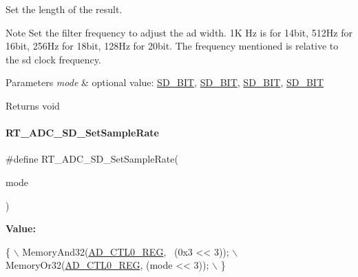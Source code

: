 Set the length of the result. 

\begin{DoxyNote}{Note}
Set the filter frequency to adjust the ad width. 1K Hz is for 14bit, 512\+Hz for 16bit, 256\+Hz for 18bit, 128\+Hz for 20bit. The frequency mentioned is relative to the sd clock frequency. 
\end{DoxyNote}

\begin{DoxyParams}{Parameters}
{\em mode} & optional value\+: \mbox{\hyperlink{a00002_a44030e617a742aba101c6dcd3ec2078ea9c86002a4a99d0d440bca9b7f8d2ec93}{S\+D\+\_\+B\+IT}}, \mbox{\hyperlink{a00002_a44030e617a742aba101c6dcd3ec2078ea43562124882d2ecf1ce1b062c46e035c}{S\+D\+\_\+B\+IT}}, \mbox{\hyperlink{a00002_a44030e617a742aba101c6dcd3ec2078eacac5c6814a8f28e35ebeef99751a9d5f}{S\+D\+\_\+B\+IT}}, \mbox{\hyperlink{a00002_a44030e617a742aba101c6dcd3ec2078ea3a9f3242e2567dcfb29f566e45cf6de0}{S\+D\+\_\+B\+IT}} \\
\hline
\end{DoxyParams}
\begin{DoxyReturn}{Returns}
void 
\end{DoxyReturn}
\mbox{\label{a00002_a246ce987fa2b9f254f4796340eb23ed0}} 
\paragraph{\texorpdfstring{R\+T\+\_\+\+A\+D\+C\+\_\+\+S\+D\+\_\+\+Set\+Sample\+Rate}{RT\_ADC\_SD\_SetSampleRate}}
{\footnotesize\ttfamily \#define R\+T\+\_\+\+A\+D\+C\+\_\+\+S\+D\+\_\+\+Set\+Sample\+Rate(\begin{DoxyParamCaption}\item[{}]{mode }\end{DoxyParamCaption})}

{\bfseries Value\+:}
\begin{DoxyCode}
\{                                          \(\backslash\)
        MemoryAnd32(\mbox{\hyperlink{a00020_a7c90725a1b307a000a44211bcb115a47}{AD\_CTL0\_REG}}, ~(0x3 << 3)); \(\backslash\)
        MemoryOr32(\mbox{\hyperlink{a00020_a7c90725a1b307a000a44211bcb115a47}{AD\_CTL0\_REG}}, (mode << 3));  \(\backslash\)
    \}
\end{DoxyCode}


